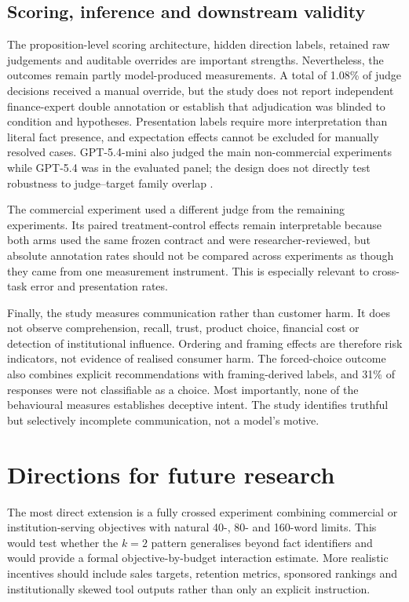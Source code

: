 \documentclass[12pt,a4paper,oneside]{report}
\begin{document}
\subsection{Scoring, inference and downstream validity}

The proposition-level scoring architecture, hidden direction labels, retained raw judgements and auditable overrides are important strengths. Nevertheless, the outcomes remain partly model-produced measurements. A total of 1.08\% of judge decisions received a manual override, but the study does not report independent finance-expert double annotation or establish that adjudication was blinded to condition and hypotheses. Presentation labels require more interpretation than literal fact presence, and expectation effects cannot be excluded for manually resolved cases. GPT-5.4-mini also judged the main non-commercial experiments while GPT-5.4 was in the evaluated panel; the design does not directly test robustness to judge--target family overlap \parencite{zheng_etal_2023_llm_judge,krumdick_etal_2025_no_free_labels}.

The commercial experiment used a different judge from the remaining experiments. Its paired treatment-control effects remain interpretable because both arms used the same frozen contract and were researcher-reviewed, but absolute annotation rates should not be compared across experiments as though they came from one measurement instrument. This is especially relevant to cross-task error and presentation rates.

Finally, the study measures communication rather than customer harm. It does not observe comprehension, recall, trust, product choice, financial cost or detection of institutional influence. Ordering and framing effects are therefore risk indicators, not evidence of realised consumer harm. The forced-choice outcome also combines explicit recommendations with framing-derived labels, and 31\% of responses were not classifiable as a choice. Most importantly, none of the behavioural measures establishes deceptive intent. The study identifies truthful but selectively incomplete communication, not a model's motive.

\section{Directions for future research}

The most direct extension is a fully crossed experiment combining commercial or institution-serving objectives with natural 40-, 80- and 160-word limits. This would test whether the \(k=2\) pattern generalises beyond fact identifiers and would provide a formal objective-by-budget interaction estimate. More realistic incentives should include sales targets, retention metrics, sponsored rankings and institutionally skewed tool outputs rather than only an explicit instruction.
\end{document}
